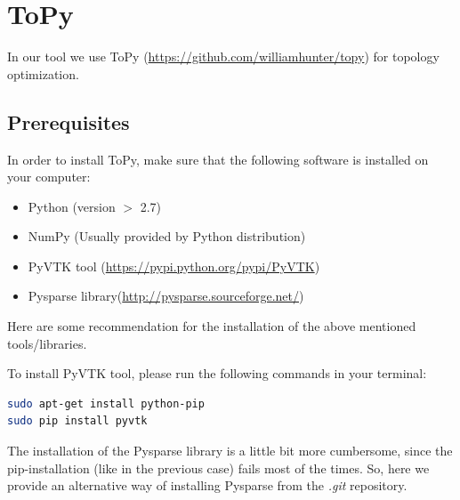 \documentclass[11pt,a4paper,article,bibtotoc,idxtotoc,headsepline,footsepline,footexclude,DIV13,oneside]{scrbook}
\begin{document}
	\frontmatter
	
	
	
	
	
	
	
	
	\tableofcontents

	\mainmatter
	

	\chapter{ToPy}
	\label{Topy}
	In our tool we use ToPy (\href{https://github.com/williamhunter/topy}{https://github.com/williamhunter/topy}) for topology optimization. 
	\section{Prerequisites}
	\label{ToPy:sec1}
	In order to install ToPy, make sure that the following software is installed on your computer:
	\begin{itemize}
	\item Python (version $>$ 2.7)
	\item NumPy (Usually provided by Python distribution)
	\item PyVTK tool (\href{https://pypi.python.org/pypi/PyVTK}{https://pypi.python.org/pypi/PyVTK}) 
	\item Pysparse library(\href{http://pysparse.sourceforge.net/}{http://pysparse.sourceforge.net/})
	\end{itemize}
	Here are some recommendation for the installation of the above mentioned tools/libraries.
	
	To install PyVTK tool, please run the following commands in your terminal:
\begin{lstlisting}[language=bash]
sudo apt-get install python-pip
sudo pip install pyvtk
\end{lstlisting}	
	
	
	The installation of the Pysparse library is a little bit more cumbersome, since the pip-installation (like in the previous case) fails most of the times. So, here we provide an alternative way of installing Pysparse from the \textit{.git} repository.
	
\end{document}
